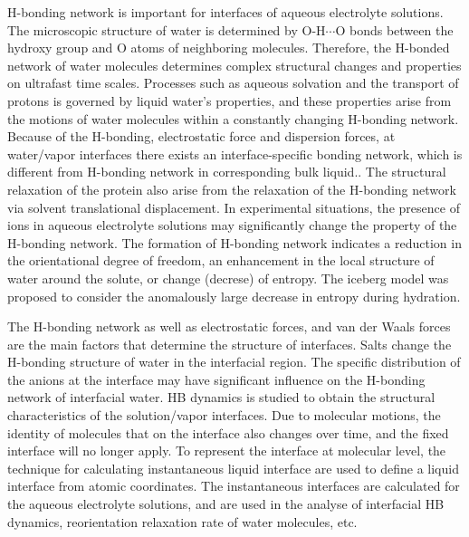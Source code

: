 H-bonding network is important for interfaces of aqueous electrolyte solutions.
The microscopic structure of water is determined by O-H$\cdots$O bonds between the hydroxy group 
and O atoms of neighboring molecules. Therefore, the H-bonded network of water molecules determines complex structural changes 
and properties on ultrafast time scales.\cite{Stenger01, Jimenez1994,Chowdhuri2002}
Processes such as aqueous solvation and the transport of protons is governed by liquid water's properties, 
and these properties arise from the motions of water molecules within a constantly changing H-bonding network\cite{CJF03}.
Because of the H-bonding, electrostatic force and dispersion forces, 
at water/vapor interfaces there exists an interface-specific bonding network, 
which is different from H-bonding network in corresponding bulk liquid.\cite{Allongue96,Velasco-Velez14}.
The structural relaxation of the protein also arise from the relaxation of the H-bonding network 
via solvent translational displacement.\cite{Tarek02} In experimental situations, the presence of ions in aqueous 
electrolyte solutions may significantly change the property of the H-bonding network. 
The formation of H-bonding network indicates a reduction in the orientational degree of freedom, 
an enhancement in the local structure of water around the solute, or change (decrese) of entropy\cite{Frank45a, Frank45b,Frank45c}.
The iceberg model was proposed to consider the anomalously large decrease in entropy during hydration\cite{Frank45c}.

%
The H-bonding network \cite{Eisenberg1969,Speedy1976,Poole1994,Soper2008b,Nilsson2011,Ball2001,Pettersson2015} as well as electrostatic forces, 
and van der Waals forces are the main factors that determine the structure of interfaces. 
Salts change the H-bonding structure of water in the interfacial region\cite{EAR04,McLain2006,Ball2008}. 
The specific distribution of the anions at the interface may have significant influence on the H-bonding network of interfacial water\cite{Morita2008}.
HB dynamics is studied to obtain the structural characteristics of the solution/vapor interfaces.
Due to molecular motions, the identity of molecules that on the interface also changes over time\cite{Willard2010}, and the fixed interface will no longer apply. 
To represent the interface at molecular level, the technique for calculating instantaneous liquid interface are used to define a liquid interface from atomic coordinates.
The instantaneous interfaces are calculated for the aqueous electrolyte solutions, and are used in the analyse of interfacial HB dynamics, 
reorientation relaxation rate of water molecules, etc.

